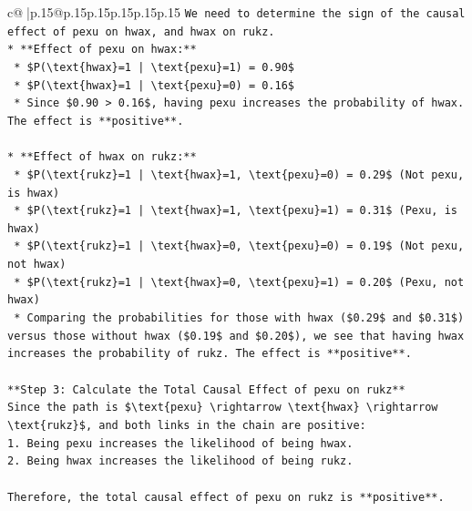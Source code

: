 \documentclass{article}
\begin{document}
{\begin{supertabular}{c@{$\;$}|p{.15\linewidth}@{}p{.15\linewidth}p{.15\linewidth}p{.15\linewidth}p{.15\linewidth}p{.15\linewidth}}
{{{\texttt{We need to determine the sign of the causal effect of pexu on hwax, and hwax on rukz.} \\
\texttt{*   **Effect of pexu on hwax:**} \\
\texttt{    *   \$P(\textbackslash{}text\{hwax\}=1 | \textbackslash{}text\{pexu\}=1) = 0.90\$} \\
\texttt{    *   \$P(\textbackslash{}text\{hwax\}=1 | \textbackslash{}text\{pexu\}=0) = 0.16\$} \\
\texttt{    *   Since \$0.90 > 0.16\$, having pexu increases the probability of hwax. The effect is **positive**.} \\
\\ 
\texttt{*   **Effect of hwax on rukz:**} \\
\texttt{    *   \$P(\textbackslash{}text\{rukz\}=1 | \textbackslash{}text\{hwax\}=1, \textbackslash{}text\{pexu\}=0) = 0.29\$ (Not pexu, is hwax)} \\
\texttt{    *   \$P(\textbackslash{}text\{rukz\}=1 | \textbackslash{}text\{hwax\}=1, \textbackslash{}text\{pexu\}=1) = 0.31\$ (Pexu, is hwax)} \\
\texttt{    *   \$P(\textbackslash{}text\{rukz\}=1 | \textbackslash{}text\{hwax\}=0, \textbackslash{}text\{pexu\}=0) = 0.19\$ (Not pexu, not hwax)} \\
\texttt{    *   \$P(\textbackslash{}text\{rukz\}=1 | \textbackslash{}text\{hwax\}=0, \textbackslash{}text\{pexu\}=1) = 0.20\$ (Pexu, not hwax)} \\
\texttt{    *   Comparing the probabilities for those with hwax (\$0.29\$ and \$0.31\$) versus those without hwax (\$0.19\$ and \$0.20\$), we see that having hwax increases the probability of rukz. The effect is **positive**.} \\
\\ 
\texttt{**Step 3: Calculate the Total Causal Effect of pexu on rukz**} \\
\texttt{Since the path is \$\textbackslash{}text\{pexu\} \textbackslash{}rightarrow \textbackslash{}text\{hwax\} \textbackslash{}rightarrow \textbackslash{}text\{rukz\}\$, and both links in the chain are positive:} \\
\texttt{1.  Being pexu increases the likelihood of being hwax.} \\
\texttt{2.  Being hwax increases the likelihood of being rukz.} \\
\\ 
\texttt{Therefore, the total causal effect of pexu on rukz is **positive**.} \\
}}}
\end{supertabular}}
\end{document}
